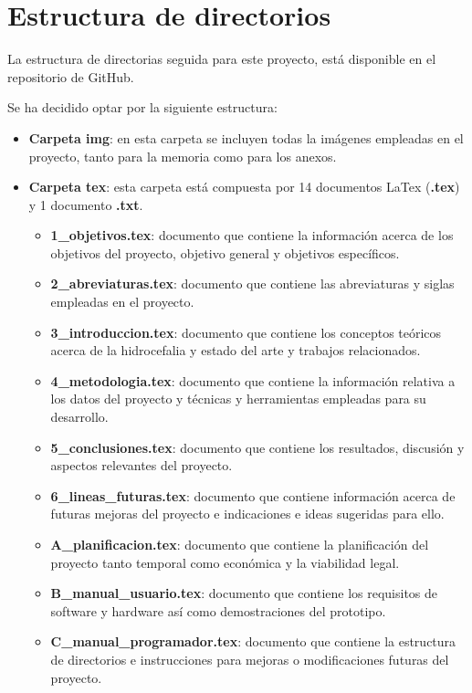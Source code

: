 
\section{Estructura de directorios}
La estructura de directorias seguida para este proyecto, está disponible en el repositorio de GitHub.

Se ha decidido optar por la siguiente estructura:
\begin{itemize} 
    \item \textbf{Carpeta img}: en esta carpeta se incluyen todas la imágenes empleadas en el proyecto, tanto para la memoria como para los anexos.
    \item \textbf{Carpeta tex}: esta carpeta está compuesta por 14 documentos LaTex (\textbf{.tex}) y 1 documento \textbf{.txt}.
    \begin{itemize}
        \item \textbf{1\_objetivos.tex}: documento que contiene la información acerca de los objetivos del proyecto, objetivo general y objetivos específicos. 
        \item \textbf{2\_abreviaturas.tex}: documento que contiene las abreviaturas y siglas empleadas en el proyecto.
        \item \textbf{3\_introduccion.tex}: documento que contiene los conceptos teóricos acerca de la hidrocefalia y estado del arte y trabajos relacionados.
        \item \textbf{4\_metodologia.tex}: documento que contiene la información relativa a los datos del proyecto y técnicas y herramientas empleadas para su desarrollo.
        \item \textbf{5\_conclusiones.tex}: documento que contiene los resultados, discusión y aspectos relevantes del proyecto.
        \item \textbf{6\_lineas\_futuras.tex}: documento que contiene información acerca de futuras mejoras del proyecto e indicaciones  e ideas sugeridas para ello.
        \item \textbf{A\_planificacion.tex}: documento que contiene la planificación del proyecto tanto temporal como económica y la viabilidad legal.
        \item \textbf{B\_manual\_usuario.tex}: documento que contiene los requisitos de software y hardware así como demostraciones del prototipo.
        \item \textbf{C\_manual\_programador.tex}: documento que contiene la estructura de directorios e instrucciones para mejoras o modificaciones futuras del proyecto.

\end{itemize}
\end{itemize}
